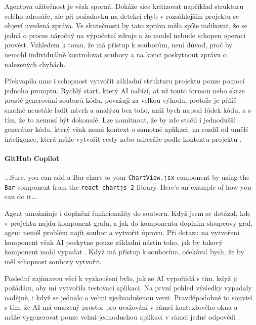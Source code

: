 \documentclass[FM,DP]{tulthesis}
\begin{document}
		Agentova užitečnost je však sporná. Dokáže sice kritizovat například strukturu celého adresáře, ale při požadavku na detekci chyb v rozsáhlejším projektu se objeví uvedená zpráva. Ve skutečnosti by tato zpráva měla spíše indikovat, že se jedná o proces náročný na výpočetní zdroje a že model nebude schopen operaci provést. Vzhledem k tomu, že má přístup k souborům, není důvod, proč by nemohl individuálně kontrolovat soubory a na konci poskytnout zprávu o nalezených chybách.
		
		Překvapila mne i schopnost vytvořit základní strukturu projektu pouze pomocí jednoho promptu. Rychlý start, který AI nabízí, ať už touto formou nebo skrze prosté generování souborů kódu, považuji za velkou výhodu, protože je příliš snadné neustále ladit návrh a analýzu bez toho, aniž bych napsal řádek kódu, a s tím, že to nemusí být dokonalé.  Lze namítnout, že by zde stačil i jednodušší generátor kódu, který však nemá kontext o samotné aplikaci, na rozdíl od umělé inteligence, která může vytvořit cesty nebo adresáře podle kontextu projektu \cite{typescript} \cite{workspace:fastAPI}.
		
		\vspace{0.6em}
		\begin{tcolorbox}[colback=white,colframe=black]
			\paragraph{GitHub Copilot}
			...Sure, you can add a Bar chart to your \verb|ChartView.jsx| component by using the \verb|Bar| component from the \verb|react-chartjs-2| library. Here's an example of how you can do it... \cite{rag_chart}
		\end{tcolorbox}
		
		Agent umožnňuje i doplnění funkcionality do souboru. Když jsem se dotázal, kde v projektu najdu komponent grafu, a jak do komponentu doplním sloupcový graf, agent neměl problém najít soubor a vytvořit úpravu. Při dotazu na vytvoření komponent však AI poskytne pouze základní nástin toho, jak by takový komponent mohl vypadat \cite{rag_chart}. Když má přístup k souborům, očekával bych, že by měl schopnost soubory vytvořit. 
		
		Poslední zajímavou věcí k vyzkoušení bylo, jak se AI vypořádá s tím, když ji požádám, aby mi vytvořila testovací aplikaci. Na první pohled výsledky vypadaly nadějně, i když se jednalo o velmi zjednodušenou verzi. Pravděpodobně to souvisí s tím, že AI má omezený prostor pro uvažování v rámci kontextového okna a může vygenerovat pouze velmi jednoduchou aplikaci v rámci jedné odpovědi \cite{compressing}. 
		
\end{document}

